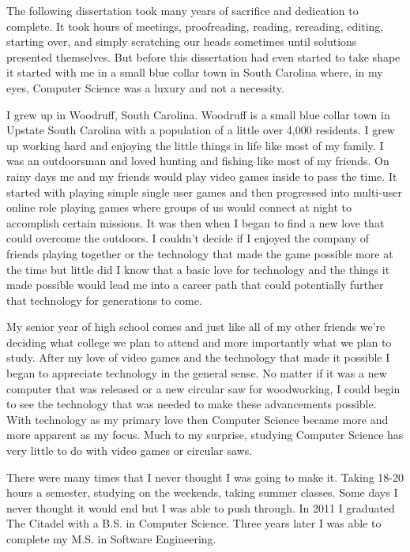 The following dissertation took many years of sacrifice and dedication to complete. It took hours of meetings, proofreading, reading, rereading, editing, starting over, and simply scratching our heads sometimes until solutions presented themselves. But before this dissertation had even started to take shape it started with me in a small blue collar town in South Carolina where, in my eyes, Computer Science was a luxury and not a necessity. 

I grew up in Woodruff, South Carolina. Woodruff is a small blue collar town in Upstate South Carolina with a population of a little over 4,000 residents. I grew up working hard and enjoying the little things in life like most of my family. I was an outdoorsman and loved hunting and fishing like most of my friends. On rainy days me and my friends would play video games inside to pass the time. It started with playing simple single user games and then progressed into multi-user online role playing games where groups of us would connect at night to accomplish certain missions. It was then when I began to find a new love that could overcome the outdoors. I couldn't decide if I enjoyed the company of friends playing together or the technology that made the game possible more at the time but little did I know that a basic love for technology and the things it made possible would lead me into a career path that could potentially further that technology for generations to come.

My senior year of high school comes and just like all of my other friends we're deciding what college we plan to attend and more importantly what we plan to study. After my love of video games and the technology that made it possible I began to appreciate technology in the general sense. No matter if it was a new computer that was released or a new circular saw for woodworking, I could begin to see the technology that was needed to make these advancements possible. With technology as my primary love then Computer Science became more and more apparent as my focus. Much to my surprise, studying Computer Science has very little to do with video games or circular saws. 

There were many times that I never thought I was going to make it. Taking 18-20 hours a semester, studying on the weekends, taking summer classes. Some days I never thought it would end but I was able to push through. In 2011 I graduated The Citadel with a B.S. in Computer Science. Three years later I was able to complete my M.S. in Software Engineering.

